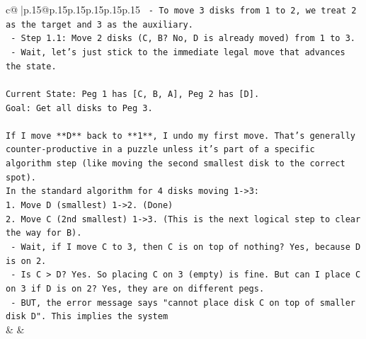 \documentclass{article}
\begin{document}
{\begin{supertabular}{c@{$\;$}|p{.15\linewidth}@{}p{.15\linewidth}p{.15\linewidth}p{.15\linewidth}p{.15\linewidth}p{.15\linewidth}}
{{{\texttt{   {-} To move 3 disks from 1 to 2, we treat 2 as the target and 3 as the auxiliary.} \\
\texttt{   {-} Step 1.1: Move 2 disks (C, B? No, D is already moved) from 1 to 3.} \\
\texttt{   {-} Wait, let's just stick to the immediate legal move that advances the state.} \\
\\ 
\texttt{Current State: Peg 1 has {[}C, B, A{]}, Peg 2 has {[}D{]}.} \\
\texttt{Goal: Get all disks to Peg 3.} \\
\\ 
\texttt{If I move **D** back to **1**, I undo my first move. That's generally counter{-}productive in a puzzle unless it's part of a specific algorithm step (like moving the second smallest disk to the correct spot).} \\
\texttt{In the standard algorithm for 4 disks moving 1{-}>3:} \\
\texttt{1. Move D (smallest) 1{-}>2. (Done)} \\
\texttt{2. Move C (2nd smallest) 1{-}>3. (This is the next logical step to clear the way for B).} \\
\texttt{   {-} Wait, if I move C to 3, then C is on top of nothing? Yes, because D is on 2.} \\
\texttt{   {-} Is C > D? Yes. So placing C on 3 (empty) is fine. But can I place C on 3 if D is on 2? Yes, they are on different pegs.} \\
\texttt{   {-} BUT, the error message says "cannot place disk C on top of smaller disk D". This implies the system} \\
            }
        }
    }
    & & \\ \\


\end{supertabular}}
\end{document}
